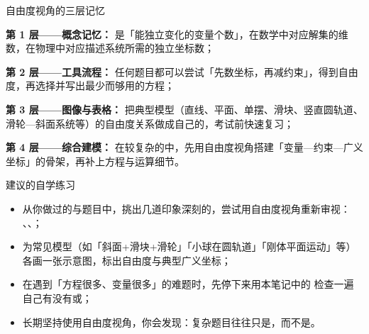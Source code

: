 \documentclass[a4paper,11pt]{ctexart}
\begin{document}
\begin{summarybox}{自由度视角的三层记忆}
  \begin{focuspoints}
    \item \textbf{第 1 层——概念记忆：}
          是「能独立变化的变量个数」，在数学中对应解集的维数，在物理中对应描述系统所需的独立坐标数；
    \item \textbf{第 2 层——工具流程：}
          任何题目都可以尝试「先数坐标，再减约束」，得到自由度，再选择并写出最少而够用的方程；
    \item \textbf{第 3 层——图像与表格：}
          把典型模型（直线、平面、单摆、滑块、竖直圆轨道、滑轮—斜面系统等）的自由度关系做成自己的，考试前快速复习；
    \item \textbf{第 4 层——综合建模：}
          在较复杂的中，先用自由度视角搭建「变量—约束—广义坐标」的骨架，再补上方程与运算细节。
  \end{focuspoints}
\end{summarybox}

\begin{notebox}{建议的自学练习}
  \begin{itemize}
    \item 从你做过的与题目中，挑出几道印象深刻的，尝试用自由度视角重新审视：\\
          、、；
    \item 为常见模型（如「斜面+滑块+滑轮」「小球在圆轨道」「刚体平面运动」等）各画一张示意图，标出自由度与典型广义坐标；
    \item 在遇到「方程很多、变量很多」的难题时，先停下来用本笔记中的 检查一遍自己有没有或；
    \item 长期坚持使用自由度视角，你会发现：复杂题目往往只是，而不是。
  \end{itemize}
\end{notebox}
\end{document}
